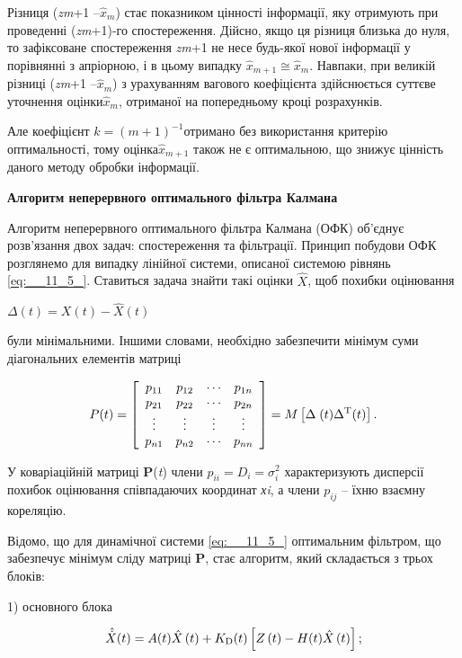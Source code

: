 Різниця (\textit{zm}+1 --$\hat{x}_{m} $) стає показником  цінності інформації, яку 
отримують при проведенні (\textit{zm}+1)-го спостереження. Дійсно, якщо ця різниця 
близька до нуля, то зафіксоване спостереження \textit{zm}+1 не несе будь-якої нової 
інформації у порівнянні з апріорною, і в цьому випадку $\hat{x}_{m+1} \cong \hat{x}_{m} $. 
Навпаки, при великій різниці  (\textit{zm}+1 --$\hat{x}_{m} $) з урахуванням вагового 
коефіцієнта здійснюється суттєве уточнення оцінки$\hat{x}_{m} $, отриманої на попередньому 
кроці розрахунків. 

Але коефіцієнт  $k=(m+1)^{-1} $отримано без використання критерію  оптимальності, 
тому оцінка$\hat{x}_{m+1} $ також не є оптимальною, що знижує цінність даного методу 
обробки інформації.


\textbf{Алгоритм неперервного оптимального фільтра Калмана}


Алгоритм неперервного оптимального фільтра Калмана (ОФК) об'єднує розв'язання 
двох задач: спостереження та фільтрації. Принцип побудови ОФК розглянемо для випадку 
лінійної системи, описаної системою рівнянь \eqref{eq:__11_5_}. Ставиться задача 
знайти такі оцінки $\hat{X}$, щоб похибки оцінювання 


$\Delta (t)=X(t)-\hat{X}(t)$


були мінімальними. Іншими словами, необхідно забезпечити мінімум суми діагональних 
елементів матриці

\[P(t)=\left[\begin{array}{cccc} {p_{11} } & {p_{12} } & {\cdots } & {p_{1n} } \\ 
{p_{21} } & {p_{22} } & {\cdots } & {p_{2n} } \\ {\vdots } & {\vdots } & {\vdots 
} & {\vdots } \\ {p_{n1} } & {p_{n2} } & {\cdots } & {p_{nn} } \end{array}\right]=M
\left[\Delta {\rm \; }(t)\Delta ^{{\rm T}} (t)\right] .\] 

У коваріаційній матриці \textbf{P}(\textit{t}) члени $p_{ii} =D_{i} =\sigma ^{2} 
_{i} $ характеризують дисперсії похибок оцінювання співпадаючих координат \textit{хi},  
а члени $p_{ij} $ -- їхню взаємну кореляцію.

Відомо, що для динамічної системи \eqref{eq:__11_5_} оптимальним фільтром, що 
забезпечує мінімум сліду матриці \textbf{P}, стає алгоритм, який складається з трьох 
блоків:

1) основного блока

\[\hat{\dot{X}}(t)=A(t)\hat{X}\left(t\right)+K_{{\rm D}} (t)\left[Z\left(t\right)-H(t)
\hat{X}\left(t\right)\right];\] 

